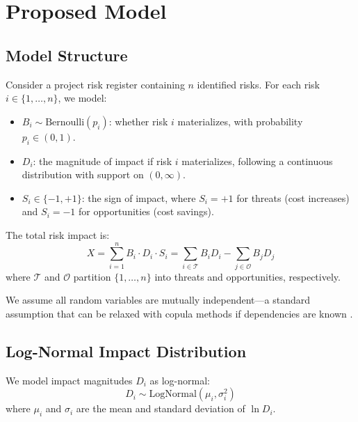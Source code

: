 \documentclass[12pt,a4paper]{article}
\theoremstyle{definition}
\theoremstyle{remark}
\begin{document}
\section{Proposed Model}
\label{sec:model}

\subsection{Model Structure}

Consider a project risk register containing $n$ identified risks. For each risk $i \in \{1, \ldots, n\}$, we model:

\begin{itemize}
    \item $B_i \sim \text{Bernoulli}(p_i)$: whether risk $i$ materializes, with probability $p_i \in (0,1)$.
    \item $D_i$: the magnitude of impact if risk $i$ materializes, following a continuous distribution with support on $(0, \infty)$.
    \item $S_i \in \{-1, +1\}$: the sign of impact, where $S_i = +1$ for threats (cost increases) and $S_i = -1$ for opportunities (cost savings).
\end{itemize}

The total risk impact is:
\begin{equation}
    X = \sum_{i=1}^{n} B_i \cdot D_i \cdot S_i = \sum_{i \in \mathcal{T}} B_i D_i - \sum_{j \in \mathcal{O}} B_j D_j
\end{equation}
where $\mathcal{T}$ and $\mathcal{O}$ partition $\{1, \ldots, n\}$ into threats and opportunities, respectively.

We assume all random variables are mutually independent—a standard assumption that can be relaxed with copula methods if dependencies are known \citep{Nelsen2006}.

\subsection{Log-Normal Impact Distribution}

We model impact magnitudes $D_i$ as log-normal:
\begin{equation}
    D_i \sim \text{LogNormal}(\mu_i, \sigma_i^2)
\end{equation}
where $\mu_i$ and $\sigma_i$ are the mean and standard deviation of $\ln D_i$.
\end{document}
